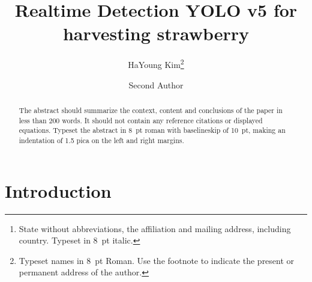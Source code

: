 \documentclass{ws-ijprai}
\begin{document}

%
\catchline{}{}{}{}{}
%
\title{Realtime Detection YOLO v5 for harvesting strawberry}

\author{HaYoung Kim\footnote{Typeset names in 8~pt Roman.
Use the footnote to indicate the present or permanent
address of the author.}}

\address{University Department, University Name, Address\\
City, State ZIP/Zone,Country\,\footnote{State without abbreviations,
the affiliation and mailing address, including country.
Typeset in 8~pt italic.}\\
}

\author{Second Author}

\address{Group, Laboratory, Address\\
City, State ZIP/Zone, Country\\
author\_id@domain\_name}

\maketitle


\begin{abstract}
The abstract should summarize the context, content
and conclusions of the paper in less than 200 words. It should
not contain any reference citations or displayed equations. Typeset the
abstract in 8~pt roman with baselineskip of 10~pt, making
an indentation of 1.5 pica on the left and right margins.
\end{abstract}


\section{Introduction}
\end{document}
